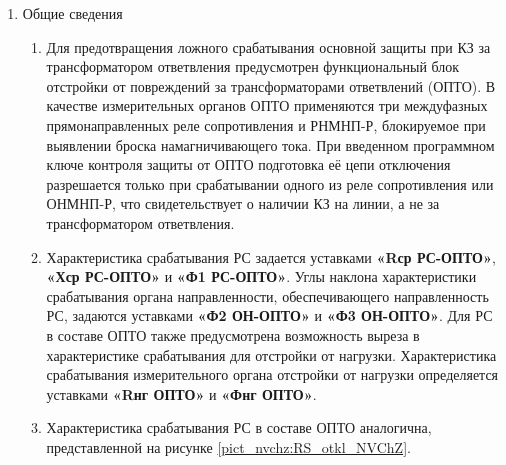 \color{black}

\begin{enumerate}

\item Общие сведения

\begin{enumerate}

\item
Для предотвращения ложного срабатывания основной защиты при КЗ за трансформатором ответвления предусмотрен функциональный блок отстройки от повреждений за трансформаторами ответвлений (ОПТО).
В качестве измерительных органов ОПТО применяются три междуфазных прямонаправленных реле сопротивления и РНМНП-Р, блокируемое при выявлении броска намагничивающего тока.
При введенном программном ключе контроля защиты от ОПТО подготовка её цепи отключения разрешается только при срабатывании одного из реле сопротивления или ОНМНП-Р, что свидетельствует о наличии КЗ на линии, а не за трансформатором ответвления.

\item
Характеристика срабатывания РС задается уставками \textbf{«Rср РС-ОПТО»}, \textbf{«Хср РС-ОПТО»} и \textbf{«Ф1 РС-ОПТО»}.
Углы наклона характеристики срабатывания органа направленности, обеспечивающего направленность РС, задаются уставками \textbf{«Ф2 ОН-ОПТО»} и \textbf{«Ф3 ОН-ОПТО»}.
Для РС в составе ОПТО также предусмотрена возможность выреза в характеристике срабатывания для отстройки от нагрузки.
Характеристика срабатывания измерительного органа отстройки от нагрузки определяется уставками \textbf{«Rнг ОПТО»} и \textbf{«Фнг ОПТО»}.

\item
Характеристика срабатывания РС в составе ОПТО аналогична, представленной на рисунке \ref{pict_nvchz:RS_otkl_NVChZ}.

%
%


\end{enumerate}
\end{enumerate}
